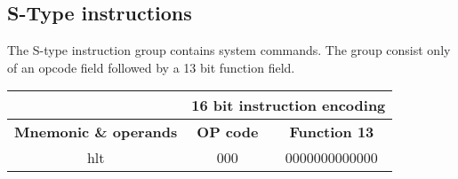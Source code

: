 \documentclass{article}
\begin{document}
\begin{par}
	\subsection{S-Type instructions}
	The S-type instruction group contains system commands. The group consist only of an opcode field followed by a 13 bit function field.
	\begin{center}
		\begin{tabular}{|c|c|c|c|c|c|}
			\hline 
			& \multicolumn{5}{|c|}{\textbf{16 bit instruction encoding}} \\ 
			\hline
			\textbf{Mnemonic \& operands} & \textbf{OP code} & \multicolumn{4}{|c|}{\textbf{Function 13}} \\
			\hline 
			hlt & 000 & \multicolumn{4}{|c|}{0000000000000} \\ 
			\hline 
		\end{tabular}
	\end{center}
\end{par}

\newpage
\end{document}
